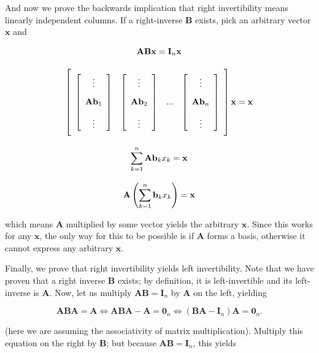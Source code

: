 	And now we prove the backwards implication that right invertibility means linearly independent columns. If a right-inverse $\mathbf{B}$ exists, pick an arbitrary vector $\mathbf{x}$ and

\begin{gather}
	\mathbf{ABx} = \mathbf{I}_n \mathbf{x} \\[3mm]
	\left[\raisebox{15mm}{} \begin{array}{cccc} \left[\begin{array}{c} \vdots \\[3mm] \mathbf{A}\mathbf{b}_1 \\[3mm] \vdots \end{array}\right] & \left[\begin{array}{c} \vdots \\[3mm] \mathbf{A}\mathbf{b}_2 \\[3mm] \vdots \end{array}\right] & ... & \left[\begin{array}{c} \vdots \\[3mm] \mathbf{A}\mathbf{b}_n \\[3mm] \vdots \end{array}\right]\end{array}\right]\mathbf{x} = \mathbf{x} \\[3mm]
	\sum\limits_{k=1}^n \mathbf{Ab}_k x_k = \mathbf{x} \\[3mm]
	\mathbf{A}\left(\sum\limits_{k=1}^n \mathbf{b}_k x_k \right) = \mathbf{x}
\end{gather}

	\noindent which means $\mathbf{A}$ multiplied by some vector yields the arbitrary $\mathbf{x}$. Since this works for any $\mathbf{x}$, the only way for this to be possible is if $\mathbf{A}$ forms a basis, otherwise it cannot express any arbitrary $\mathbf{x}$.

	Finally, we prove that right invertibility yields left invertibility. Note that we have proven that a right inverse $\mathbf{B}$ exists; by definition, it is left-invertible and its left-inverse is $\mathbf{A}$.  Now, let us multiply $\mathbf{AB} = \mathbf{I}_n$ by $\mathbf{A}$ on the left, yielding

\begin{equation} \mathbf{ABA} = \mathbf{A} \Leftrightarrow \mathbf{ABA} - \mathbf{A} = \mathbf{0}_n \Leftrightarrow \left(\mathbf{BA} - \mathbf{I}_n\right)\mathbf{A} = \mathbf{0}_n .\end{equation}

	\noindent (here we are assuming the associativity of matrix multiplication). Multiply this equation on the right by $\mathbf{B}$; but because $\mathbf{AB} = \mathbf{I}_n$, this yields

